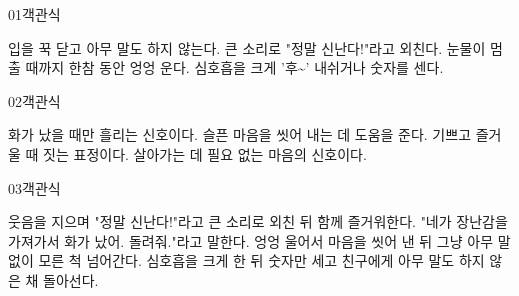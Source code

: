 \documentclass[fs13,seriesSau]{korfarm-base}
\begin{document}
\kfActivityBg \par{}\par\nopagebreak[4]\smallskip\nopagebreak[4]


\begin{kfQBlock}{01}{객관식}
\begin{kfChoices}
\kfChoice 입을 꾹 닫고 아무 말도 하지 않는다.
\kfChoice 큰 소리로 "정말 신난다!"라고 외친다.
\kfChoice 눈물이 멈출 때까지 한참 동안 엉엉 운다.
\kfChoice 심호흡을 크게 '후\textasciitilde{}' 내쉬거나 숫자를 센다.
\end{kfChoices}
\end{kfQBlock}
\begin{kfQBlock}{02}{객관식}
\begin{kfChoices}
\kfChoice 화가 났을 때만 흘리는 신호이다.
\kfChoice 슬픈 마음을 씻어 내는 데 도움을 준다.
\kfChoice 기쁘고 즐거울 때 짓는 표정이다.
\kfChoice 살아가는 데 필요 없는 마음의 신호이다.
\end{kfChoices}
\end{kfQBlock}
\begin{kfQBlock}{03}{객관식}
\begin{kfChoices}
\kfChoice 웃음을 지으며 "정말 신난다!"라고 큰 소리로 외친 뒤 함께 즐거워한다.
\kfChoice "네가 장난감을 가져가서 화가 났어. 돌려줘."라고 말한다.
\kfChoice 엉엉 울어서 마음을 씻어 낸 뒤 그냥 아무 말 없이 모른 척 넘어간다.
\kfChoice 심호흡을 크게 한 뒤 숫자만 세고 친구에게 아무 말도 하지 않은 채 돌아선다.
\end{kfChoices}
\end{kfQBlock}


\end{document}
